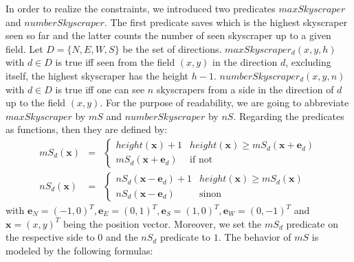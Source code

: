\documentclass[a4paper, 12pt, titlepage]{article}
\begin{document}
In order to realize the constraints, we introduced two predicates $maxSkyscraper$ and $numberSkyscraper$. The first predicate saves which is the highest skyscraper seen so far and the latter counts the number of seen skyscraper up to a given field. Let $D=\{N, E, W, S\}$ be the set of directions. $maxSkyscraper_{d}(x,y,h)$ with $d \in D$ is true iff seen from the field $(x,y)$ in the direction $d$, excluding itself, the highest skyscraper has the height $h-1$. $numberSkyscraper_{d}(x,y,n)$ with $d \in D$ is true iff one can see $n$ skyscrapers from a side in the direction of $d$ up to the field $(x,y)$. For the purpose of readability, we are going to abbreviate $maxSkyscraper$ by $mS$ and $numberSkyscraper$ by $nS$. Regarding the predicates as functions, then they are defined by:
	\begin{eqnarray}
		mS_{d}(\pmb x) &=& 
		\begin{cases}
			height(\pmb x)+1 & height(\pmb x) \ge mS_{d}(\pmb x + \pmb e_{d})\\
			mS_{d}(\pmb x + \pmb e_{d}) &\text{if not}
		\end{cases}
		\\
		nS_{d}(\pmb x) &=&
		\begin{cases}
			nS_{d}(\pmb x - \pmb e_{d}) + 1 & height(\pmb x) \ge mS_{d}(\pmb x)\\
			nS_{d}(\pmb x - \pmb e_{d}) &\text{sinon}
		\end{cases}
	\end{eqnarray}
with $\pmb e_{N} = (-1,0)^T, \pmb e_{E} = (0,1)^T, \pmb e_{S} = (1,0)^T,\pmb e_{W} = (0,-1)^T$ and $\pmb x = (x,y)^T$ being the position vector. Moreover, we set the $mS_{d}$ predicate on the respective side to $0$ and the $nS_{d}$ predicate to $1$. The behavior of $mS$ is modeled by the following formulas:
\end{document}
